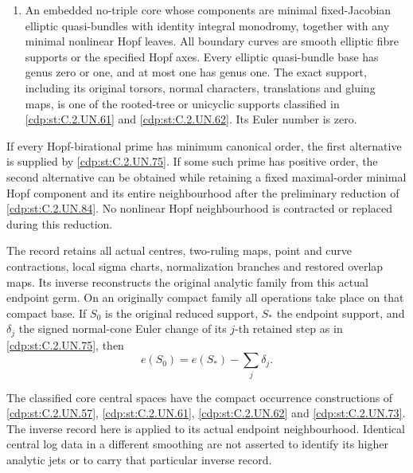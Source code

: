 \begin{proposition}
\begin{enumerate}
\item An embedded no-triple core whose components are
minimal fixed-Jacobian elliptic quasi-bundles with identity
integral monodromy, together with any minimal nonlinear
Hopf leaves. All boundary curves are smooth elliptic fibre
supports or the specified Hopf axes. Every elliptic
quasi-bundle base has genus zero or one, and at most one
has genus one. The exact support, including its original
torsors, normal characters, translations and gluing maps,
is one of the rooted-tree or unicyclic supports classified
in \ref{cdp:st:C.2.UN.61} and \ref{cdp:st:C.2.UN.62}. Its Euler number is zero.
\end{enumerate}

If every Hopf-birational prime has minimum canonical order,
the first alternative is supplied by \ref{cdp:st:C.2.UN.75}. If some such
prime has positive order, the second alternative can be
obtained while retaining a fixed maximal-order minimal
Hopf component and its entire neighbourhood after the
preliminary reduction of \ref{cdp:st:C.2.UN.84}. No nonlinear Hopf
neighbourhood is contracted or replaced during this
reduction.

The record retains all actual centres, two-ruling maps,
point and curve contractions, local sigma charts,
normalization branches and restored overlap maps.
Its inverse reconstructs the original analytic family
from this actual endpoint germ. On an originally compact
family all operations take place on that compact base.
If \(S_0\) is the original reduced support, \(S_*\) the
endpoint support, and \(\delta_j\) the signed normal-cone
Euler change of its \(j\)-th retained step as in \ref{cdp:st:C.2.UN.75},
then
\[
                 e(S_0)=e(S_*)-\sum_j\delta_j.
 \tag{C.GP.1}\label{cdp:eq:C.GP.1}
\]

The classified core central spaces have the compact
occurrence constructions of \ref{cdp:st:C.2.UN.57}, \ref{cdp:st:C.2.UN.61}, \ref{cdp:st:C.2.UN.62} and \ref{cdp:st:C.2.UN.73}.
The inverse record here is applied to its actual endpoint
neighbourhood. Identical central log data in a different
smoothing are not asserted to identify its higher analytic
jets or to carry that particular inverse record.
\end{proposition}


